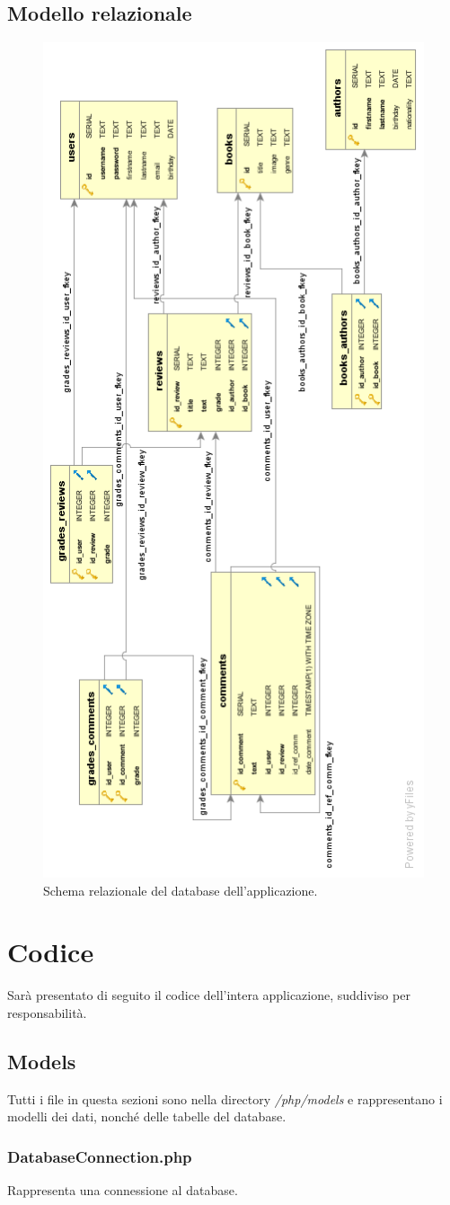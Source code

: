 \documentclass[italian]{article}
\begin{document}
\subsection{Modello relazionale}
\begin{figure}[h]
	\centering
	\includegraphics[width=0.5\linewidth]{images/schema}
	\caption[Schema relazionale]{Schema relazionale del database dell'applicazione.}
	\label{fig:schemarelazionale}
\end{figure}
\pagebreak
\section{Codice}
Sarà presentato di seguito il codice dell'intera applicazione, suddiviso per responsabilità.

\subsection{Models}
Tutti i file in questa sezioni sono nella directory \textit{/php/models} e rappresentano i modelli dei dati, nonché delle tabelle del database.

\subsubsection{DatabaseConnection.php}
Rappresenta una connessione al database.

\end{document}
